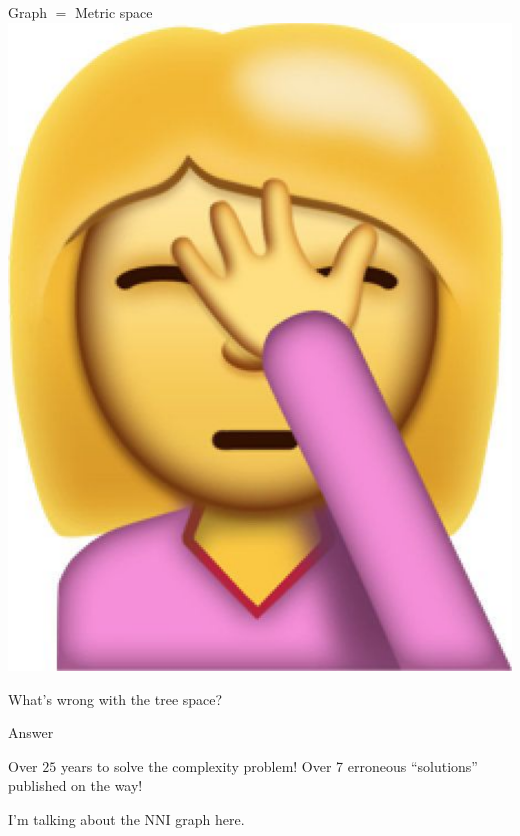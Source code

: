 \documentclass{beamer}
\newcommand{\nni}{\mathrm{NNI}}
\begin{document}
\begin{frame}{Graph $=$ Metric space}
\pause
\centering
\includegraphics[width=0.4\framewidth]{facepalm1}
\end{frame}

\begin{frame}{What's wrong with the tree space?}
\begin{block}{Answer}
\begin{outline}
\1 Over $25$ years to solve the complexity problem!
\pause
\1 Over 7 erroneous ``solutions'' published on the way!
\end{outline}
\end{block}

\vskip20pt
\pause

\begin{block}{}
I'm talking about the $\nni$ graph here.
\end{block}
\end{frame}
\end{document}
